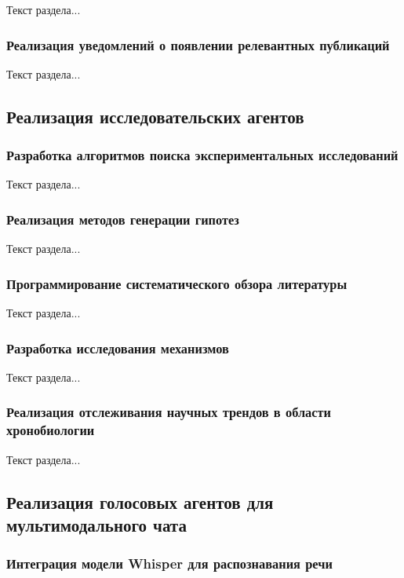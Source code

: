 Текст раздела...

\subsubsection{Реализация уведомлений о появлении релевантных публикаций}

Текст раздела...

\subsection{Реализация исследовательских агентов}

\subsubsection{Разработка алгоритмов поиска экспериментальных исследований}

Текст раздела...

\subsubsection{Реализация методов генерации гипотез}

Текст раздела...

\subsubsection{Программирование систематического обзора литературы}

Текст раздела...

\subsubsection{Разработка исследования механизмов}

Текст раздела...

\subsubsection{Реализация отслеживания научных трендов в области хронобиологии}

Текст раздела...

\subsection{Реализация голосовых агентов для мультимодального чата}

\subsubsection{Интеграция модели Whisper для распознавания речи}

